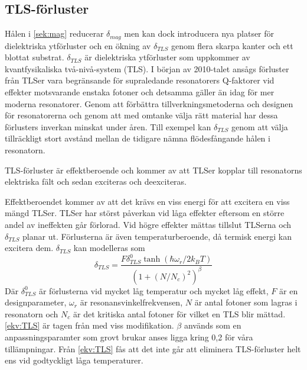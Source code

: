 \documentclass[main.tex]{subfiles}
\begin{document}
\subsection{TLS-förluster}

\label{sec:tls}
Hålen i \ref{sek:mag} reducerar $\delta_{mag}$ men kan dock introducera nya platser för dielektriska ytförluster och en ökning av $\delta_{TLS}$ genom flera skarpa kanter och ett blottat substrat\cite{Chiaro2016}. $\delta_{TLS}$ är dielektriska ytförluster som uppkommer av kvantfysikaliska två-nivå-system (TLS). I början av 2010-talet ansågs förluster från TLSer vara begränsande för supraledande resonatorers Q-faktorer vid effekter motsvarande enstaka fotoner\cite{Siddiqi2011} och detsamma gäller än idag för mer moderna resonatorer\cite{Boehme2016}\cite{Goetz2016}. Genom att förbättra tillverkningsmetoderna och designen för resonatorerna och genom att med omtanke välja rätt material har dessa förlusters inverkan minskat under åren\cite{Oliver2013}. Till exempel kan $\delta_{TLS}$ genom att välja tillräckligt stort avstånd mellan de tidigare nämna flödesfångande hålen i resonatorn\cite{Chiaro2016}.

TLS-förluster är effektberoende och kommer av att TLSer kopplar till resonatorns elektriska fält och sedan exciteras och deexciteras\cite{Boehme2016,Goetz2016}. 

Effektberoendet kommer av att det krävs en viss energi för att excitera en viss mängd TLSer. TLSer har störst påverkan vid låga effekter eftersom en större andel av ineffekten går förlorad. Vid högre effekter mättas tillslut TLSerna och $\delta_{TLS}$ planar ut. Förlusterna är även temperaturberoende, då termisk energi kan excitera dem. $\delta_{TLS}$ kan modelleras som
\begin{equation}
    \delta_{TLS}=\frac{F\delta_{TLS}^0\tanh{(\hbar\omega_r/2k_BT)}}{(1+(N/N_c)^2)^\beta}
    \label{ekv:TLS}
\end{equation}
Där $\delta_{TLS}^0$ är förlusterna vid mycket låg temperatur och mycket låg effekt, $F$ är en designparameter, $\omega_r$ är resonansvinkelfrekvensen, $N$ är antal fotoner som lagras i resonatorn och $N_c$ är det kritiska antal fotoner för vilket en TLS blir mättad. \ref{ekv:TLS} är tagen från\cite{pappas2011two} med viss modifikation. $\beta$ används som en anpassningsparamter som grovt brukar anses ligga kring 0,2\cite{faoro2012} för våra tillämpningar. Från \ref{ekv:TLS} fås att det inte går att eliminera TLS-förluster helt ens vid godtyckligt låga temperaturer\cite{Boehme2016}.
\end{document}
